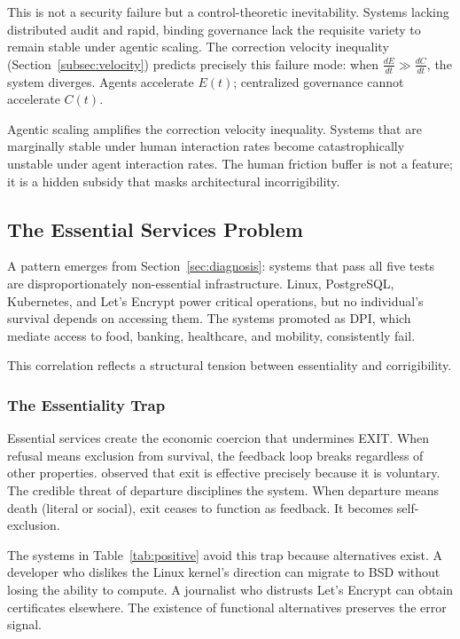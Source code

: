This is not a security failure but a control-theoretic inevitability. Systems lacking distributed audit and rapid, binding governance lack the requisite variety to remain stable under agentic scaling. The correction velocity inequality (Section~\ref{subsec:velocity}) predicts precisely this failure mode: when $\frac{dE}{dt} \gg \frac{dC}{dt}$, the system diverges. Agents accelerate $E(t)$; centralized governance cannot accelerate $C(t)$.

\begin{claim}
Agentic scaling amplifies the correction velocity inequality. Systems that are marginally stable under human interaction rates become catastrophically unstable under agent interaction rates. The human friction buffer is not a feature; it is a hidden subsidy that masks architectural incorrigibility.
\end{claim}

\subsection{The Essential Services Problem}
\label{subsec:essential}

A pattern emerges from Section~\ref{sec:diagnosis}: systems that pass all five tests are disproportionately non-essential infrastructure. Linux, PostgreSQL, Kubernetes, and Let's Encrypt power critical operations, but no individual's survival depends on accessing them. The systems promoted as DPI, which mediate access to food, banking, healthcare, and mobility, consistently fail.

This correlation reflects a structural tension between essentiality and corrigibility.

\subsubsection{The Essentiality Trap}

Essential services create the economic coercion that undermines EXIT. When refusal means exclusion from survival, the feedback loop breaks regardless of other properties. \citet{hirschman1970} observed that exit is effective precisely because it is voluntary. The credible threat of departure disciplines the system. When departure means death (literal or social), exit ceases to function as feedback. It becomes self-exclusion.

The systems in Table~\ref{tab:positive} avoid this trap because alternatives exist. A developer who dislikes the Linux kernel's direction can migrate to BSD without losing the ability to compute. A journalist who distrusts Let's Encrypt can obtain certificates elsewhere. The existence of functional alternatives preserves the error signal.

